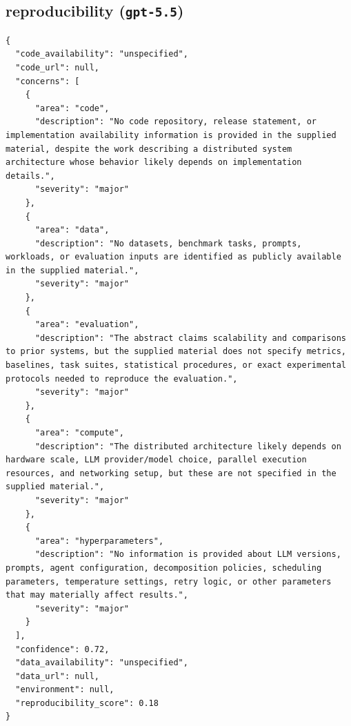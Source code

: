 \documentclass[11pt]{article}
\begin{document}
\subsection*{reproducibility (\texttt{gpt-5.5})}
\begin{verbatim}
{
  "code_availability": "unspecified",
  "code_url": null,
  "concerns": [
    {
      "area": "code",
      "description": "No code repository, release statement, or implementation availability information is provided in the supplied material, despite the work describing a distributed system architecture whose behavior likely depends on implementation details.",
      "severity": "major"
    },
    {
      "area": "data",
      "description": "No datasets, benchmark tasks, prompts, workloads, or evaluation inputs are identified as publicly available in the supplied material.",
      "severity": "major"
    },
    {
      "area": "evaluation",
      "description": "The abstract claims scalability and comparisons to prior systems, but the supplied material does not specify metrics, baselines, task suites, statistical procedures, or exact experimental protocols needed to reproduce the evaluation.",
      "severity": "major"
    },
    {
      "area": "compute",
      "description": "The distributed architecture likely depends on hardware scale, LLM provider/model choice, parallel execution resources, and networking setup, but these are not specified in the supplied material.",
      "severity": "major"
    },
    {
      "area": "hyperparameters",
      "description": "No information is provided about LLM versions, prompts, agent configuration, decomposition policies, scheduling parameters, temperature settings, retry logic, or other parameters that may materially affect results.",
      "severity": "major"
    }
  ],
  "confidence": 0.72,
  "data_availability": "unspecified",
  "data_url": null,
  "environment": null,
  "reproducibility_score": 0.18
}
\end{verbatim}
\end{document}
